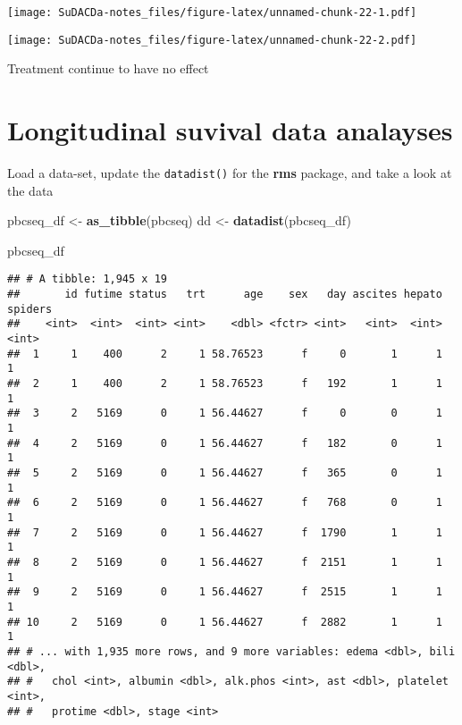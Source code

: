\documentclass[]{book}
\newenvironment{Shaded}{\begin{snugshade}}{\end{snugshade}}
\newcommand{\KeywordTok}[1]{\textcolor[rgb]{0.13,0.29,0.53}{\textbf{{#1}}}}
\newcommand{\DataTypeTok}[1]{\textcolor[rgb]{0.13,0.29,0.53}{{#1}}}
\newcommand{\StringTok}[1]{\textcolor[rgb]{0.31,0.60,0.02}{{#1}}}
\newcommand{\OtherTok}[1]{\textcolor[rgb]{0.56,0.35,0.01}{{#1}}}
\newcommand{\NormalTok}[1]{{#1}}
\theoremstyle{definition}
\theoremstyle{definition}
\theoremstyle{definition}
\theoremstyle{remark}
\begin{document}
\texttt{[image: SuDACDa-notes\_files/figure-latex/unnamed-chunk-22-1.pdf]}

\begin{Shaded}
\end{Shaded}

\texttt{[image: SuDACDa-notes\_files/figure-latex/unnamed-chunk-22-2.pdf]}

Treatment continue to have no effect

\section{Longitudinal suvival data analayses}\label{longitudinal}

Load a data-set, update the \texttt{datadist()} for the \textbf{rms}
package, and take a look at the data

\begin{Shaded}
\begin{Highlighting}[]
\NormalTok{pbcseq_df <-}\StringTok{ }\KeywordTok{as_tibble}\NormalTok{(pbcseq)}
\NormalTok{dd <-}\StringTok{ }\KeywordTok{datadist}\NormalTok{(pbcseq_df)}

\NormalTok{pbcseq_df}
\end{Highlighting}
\end{Shaded}

\begin{verbatim}
## # A tibble: 1,945 x 19
##       id futime status   trt      age    sex   day ascites hepato spiders
##    <int>  <int>  <int> <int>    <dbl> <fctr> <int>   <int>  <int>   <int>
##  1     1    400      2     1 58.76523      f     0       1      1       1
##  2     1    400      2     1 58.76523      f   192       1      1       1
##  3     2   5169      0     1 56.44627      f     0       0      1       1
##  4     2   5169      0     1 56.44627      f   182       0      1       1
##  5     2   5169      0     1 56.44627      f   365       0      1       1
##  6     2   5169      0     1 56.44627      f   768       0      1       1
##  7     2   5169      0     1 56.44627      f  1790       1      1       1
##  8     2   5169      0     1 56.44627      f  2151       1      1       1
##  9     2   5169      0     1 56.44627      f  2515       1      1       1
## 10     2   5169      0     1 56.44627      f  2882       1      1       1
## # ... with 1,935 more rows, and 9 more variables: edema <dbl>, bili <dbl>,
## #   chol <int>, albumin <dbl>, alk.phos <int>, ast <dbl>, platelet <int>,
## #   protime <dbl>, stage <int>
\end{verbatim}
\end{document}
